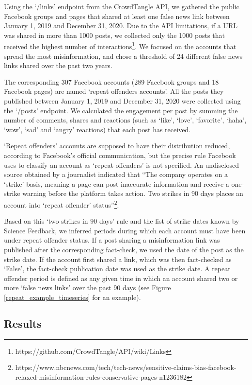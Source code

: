 \documentclass[11pt,a4paper]{article}
\begin{document}
Using the `/links' endpoint from the CrowdTangle API, we gathered the public Facebook groups and pages that shared at least one false news link between January 1, 2019 and December 31, 2020. 
Due to the API limitations, if a URL was shared in more than 1000 posts, we collected only the 1000 posts that received the highest number of interactions\footnote{https://github.com/CrowdTangle/API/wiki/Links}. 
We focused on the accounts that spread the most misinformation, and chose a threshold of 24 different false news links shared over the past two years. 

The corresponding 307 Facebook accounts (289 Facebook groups and 18 Facebook pages) are named `repeat offenders accounts'. 
All the posts they published between January 1, 2019 and December 31, 2020 were collected using the `/posts' endpoint. 
We calculated the engagement per post by summing the number of comments, shares and reactions (such as ‘like’, ‘love’, ‘favorite’, ‘haha’, ‘wow’, ‘sad’ and ‘angry’ reactions) that each post has received.

`Repeat offenders' accounts are supposed to have their distribution reduced, according to Facebook's official communication, but the precise rule Facebook uses to classify an account as `repeat offenders' is not specified. 
An undisclosed source obtained by a journalist indicated that ``The company operates on a `strike' basis, meaning a page can post inaccurate information and receive a one-strike warning before the platform takes action. 
Two strikes in 90 days places an account into `repeat offender' status''\footnote{https://www.nbcnews.com/tech/tech-news/sensitive-claims-bias-facebook-relaxed-misinformation-rules-conservative-pages-n1236182}.

Based on this `two strikes in 90 days' rule and the list of strike dates known by Science Feedback, we inferred periods during which each account must have been under repeat offender status. 
If a post sharing a misinformation link was published after the corresponding fact-check, we used the date of the post as the strike date. 
If the account first shared a link, which was then fact-checked as `False', the fact-check publication date was used as the strike date. 
A repeat offender period is defined as any given time in which an account shared two or more `false news links' over the past 90 days (see Figure \ref{repeat_example_timeseries} for an example).

\subsection{Results}
\end{document}
